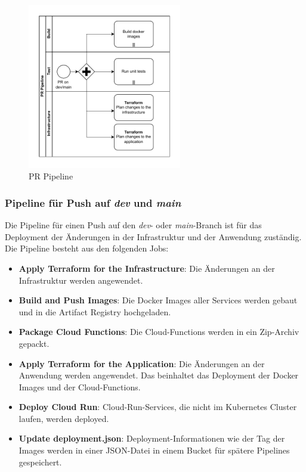 \begin{figure}[ht]
  \centering
  \includegraphics[width=0.6\textwidth]{resources/pr-pipeline.pdf}
  \caption{PR Pipeline}
  \label{fig:pr-pipeline}
\end{figure}


\subsubsection*{Pipeline für Push auf \textit{dev} und \textit{main}}

Die Pipeline für einen Push auf den \textit{dev}- oder \textit{main}-Branch ist für das 
Deployment der Änderungen in der Infrastruktur und der Anwendung zuständig.
Die Pipeline besteht aus den folgenden Jobs:

\begin{itemize}
  \item \textbf{Apply Terraform for the Infrastructure}: Die Änderungen an der Infrastruktur werden angewendet.
  \item \textbf{Build and Push Images}: Die Docker Images aller Services werden gebaut und in die Artifact Registry hochgeladen.
  \item \textbf{Package Cloud Functions}: Die Cloud-Functions werden in ein Zip-Archiv gepackt.
  \item \textbf{Apply Terraform for the Application}: Die Änderungen an der Anwendung werden angewendet. Das beinhaltet das Deployment der Docker Images und der Cloud-Functions.
  \item \textbf{Deploy Cloud Run}: Cloud-Run-Services, die nicht im Kubernetes Cluster laufen, werden deployed.
  \item \textbf{Update deployment.json}: Deployment-Informationen wie der Tag der Images werden in einer JSON-Datei in einem Bucket für spätere Pipelines gespeichert.
\end{itemize}

